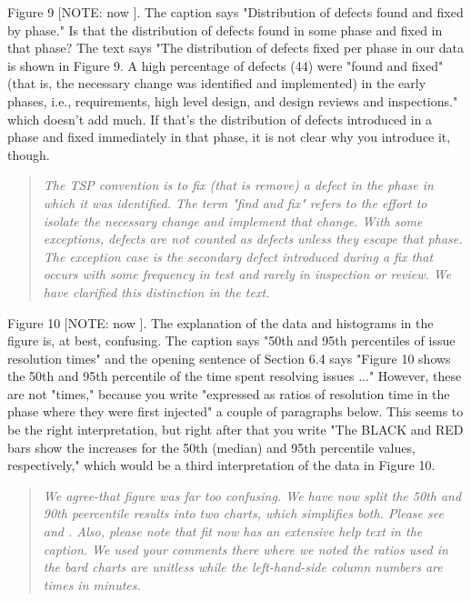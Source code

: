 Figure 9 [NOTE: now ]. The caption says "Distribution of defects found
and fixed by phase." Is that the distribution of defects
found in some phase and fixed in that phase? The text says
"The distribution of defects  fixed per phase in
our data is shown in Figure 9. A high percentage of defects
(44) were "found and fixed" (that is, the necessary change was identified and implemented)   in the early phases, i.e.,
requirements, high level design, and design reviews and
inspections." which doesn't add much. If that's the
distribution of defects introduced in a phase and fixed
immediately in that phase, it is not clear why you introduce
it, though.
\begin{quote}
{\em 
The TSP convention is to fix (that is remove) a defect in the phase in which it was identified.  The term "find and fix" refers to the effort to isolate the necessary change and implement that change. With some exceptions, defects are not counted as defects unless they escape that phase. The exception case is the secondary defect introduced during a fix that occurs with some frequency in test and rarely in inspection or review. We have clarified this distinction in the text.}
\end{quote}
Figure 10 [NOTE: now ]. The explanation of the data and histograms in the
figure is, at best, confusing. The caption says "50th and
95th percentiles of issue resolution times" and the opening
sentence of Section 6.4 says "Figure 10 shows the 50th and
95th percentile of the time spent resolving issues ..."
However, these are not "times," because you write "expressed
as ratios of resolution time in the phase where they were
first injected" a couple of paragraphs below. This seems to
be the right interpretation, but right after that you write
"The BLACK and RED bars show the increases for the 50th
(median) and 95th percentile values, respectively," which
would be a third interpretation of the data in Figure 10.
\begin{quote}
{\em We agree-that figure was far too confusing. We have now split the 50th and 90th peercentile results
into two charts, which simplifies both. Please see  and .
Also, please note that fit now has an extensive help text in the caption.
We used your comments there where we noted the ratios used in the
bard charts are unitless while the left-hand-side column numbers are
times in minutes.
}
\end{quote}
 
